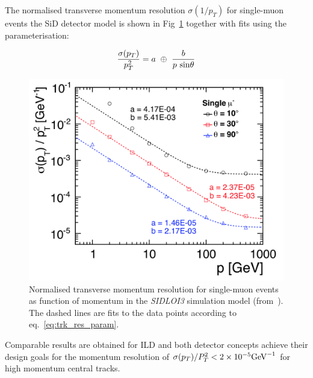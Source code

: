 The normalised transverse momentum resolution $\sigma(1/p_T)$ for single-muon events the SiD detector model is shown in
Fig~\ref{fig:sid_mom_res} together with fits using the parameterisation:

\begin{equation}
  \frac{\sigma(p_T)}{p^2_T} = a~\oplus~\frac{b}{p~\rm{sin}\theta}     \label{eq:trk_res_param}
\end{equation}

\begin{figure}
\begin{center}
\includegraphics[width=0.95\hsize]{chapters/figures/SiD_momentum_resolution.png}
\end{center}
\caption{Normalised transverse momentum resolution for single-muon events as function of momentum
  in the \emph{SIDLOI3} simulation model (from~\cite{Behnke:2013lya}). The dashed lines are fits to the data points according
  to eq.~\ref{eq:trk_res_param}.}
\label{fig:sid_mom_res}
\end{figure}

Comparable results are obtained for ILD and both detector concepts achieve their design goals for the momentum resolution of
$\sigma(p_T)/P^2_T  < 2 \times 10^{-5} \rm{GeV}^{-1}$ for high momentum central tracks.

